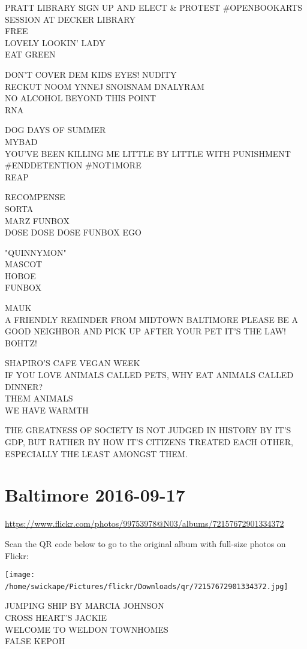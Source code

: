 \documentclass[10pt,letterpaper]{article}
\begin{document}
PRATT LIBRARY SIGN UP AND ELECT \& PROTEST \#OPENBOOKARTS SESSION AT DECKER LIBRARY\\
FREE\\
LOVELY LOOKIN' LADY\\
EAT GREEN

DON'T COVER DEM KIDS EYES!  NUDITY\\
RECKUT NOOM YNNEJ SNOISNAM DNALYRAM\\
NO ALCOHOL BEYOND THIS POINT\\
RNA

DOG DAYS OF SUMMER\\
MYBAD\\
YOU'VE BEEN KILLING ME LITTLE BY LITTLE WITH PUNISHMENT \#ENDDETENTION \#NOT1MORE\\
REAP

RECOMPENSE\\
SORTA\\
MARZ FUNBOX\\
DOSE DOSE DOSE FUNBOX EGO

"QUINNYMON"\\
MASCOT\\
HOBOE\\
FUNBOX

MAUK\\
A FRIENDLY REMINDER FROM MIDTOWN BALTIMORE PLEASE BE A GOOD NEIGHBOR AND PICK UP AFTER YOUR PET IT'S THE LAW!\\
BOHTZ!

SHAPIRO'S CAFE VEGAN WEEK\\
IF YOU LOVE ANIMALS CALLED PETS, WHY EAT ANIMALS CALLED DINNER?\\
THEM ANIMALS\\
WE HAVE WARMTH

THE GREATNESS OF SOCIETY IS NOT JUDGED IN HISTORY BY IT'S GDP, BUT RATHER BY HOW IT'S CITIZENS TREATED EACH OTHER, ESPECIALLY THE LEAST AMONGST THEM.
\

\section*{Baltimore 2016-09-17}

\url{https://www.flickr.com/photos/99753978@N03/albums/72157672901334372}

Scan the QR code below to go to the original album with full-size photos on Flickr:

\texttt{[image: /home/swickape/Pictures/flickr/Downloads/qr/72157672901334372.jpg]}
\

JUMPING SHIP BY MARCIA JOHNSON\\
CROSS HEART'S JACKIE\\
WELCOME TO WELDON TOWNHOMES\\
FALSE KEPOH
\end{document}

